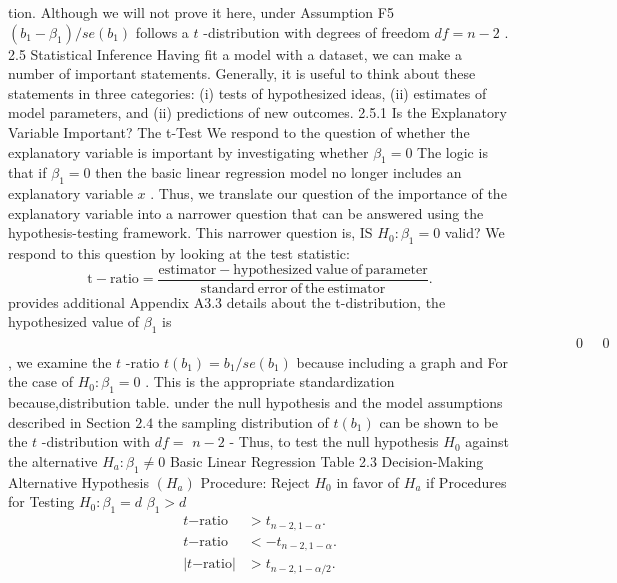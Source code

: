 \documentclass[11pt]{article}
\begin{document}
tion. Although we will not prove it here, under Assumption F5 \(\left( b_{1}-\beta_{1} \right) / s e ( b_{1} )\)
follows a \(t\) -distribution with degrees of freedom \(d f=n-2\) .
 2.5 Statistical Inference
Having fit a model with a dataset, we can make a number of important statements.
Generally, it is useful to think about these statements in three categories: (i) tests
of hypothesized ideas, (ii) estimates of model parameters, and (ii) predictions of
new outcomes.
2.5.1 Is the Explanatory Variable Important? The t-Test
We respond to the question of whether the explanatory variable is important
by investigating whether \(\beta_{1}=0\) The logic is that if \(\beta_{1}=0\) then the basic
linear regression model no longer includes an explanatory variable \(x\) . Thus,
 we translate our question of the importance of the explanatory variable into a
 narrower question that can be answered using the hypothesis-testing framework.
This narrower question is, IS \(H_{0} : \beta_{1}=0\) valid? We respond to this question by
looking at the test statistic:
\[
\mathrm{t-r a t i o}=\frac{\mathrm{e s t i m a t o r-h y p o t h e s i z e d ~ v a l u e ~ o f ~ p a r a m e t e r}} {\mathrm{s t a n d a r d ~ e r r o r ~ o f ~ t h e ~ e s t i m a t o r}} .
\]
provides additional
Appendix A3.3
details about the
t-distribution,
 the hypothesized value of \(\beta_{1}\) is \(\; \; \; \; \; \; \; \; \; \; \; \; \; \; \; \; \; \; \; \; \; \; \; \; \; \; \; \; \; \; \; \; \; \; \; \; \; \; \; \; \; \; \; \; \; \; \; \; \; \; \; \; \; \; \; \; \; \; \; \; \; \; \; \; \; \; \; \; \; \; \; \; \; \; \; \; \; \; \; \; \; \; \; \; \; \; \; \; \; \; \; \; \; \; \; \; \; \; \; \; \; \; \; \; \; \; \; \; \; \; \; \; \; \; \; \; \; \; \; \; \; \; \; \; \; \; \; \; \; \; \; \; \; \; \; \; \; \; \; \; \; \; \; \; \; \; 0 \; \; \; \; \; 0\) , we examine the \(t\) -ratio \(t ( b_{1} )=b_{1} / s e ( b_{1} )\) because including a graph and
For the case of \(H_{0} : \beta_{1}=0\) . This is the appropriate standardization because,distribution table.
under the null hypothesis and the model assumptions described in Section \(2 . 4\)
the sampling distribution of \(t ( b_{1} )\) can be shown to be the \(t\) -distribution with \(d f=\)
\(n-2\) - Thus, to test the null hypothesis \(H_{0}\) against the alternative \(H_{a} : \beta_{1} \neq0\)
 Basic Linear Regression
Table 2.3
Decision-Making Alternative Hypothesis \(( H_{a} )\) Procedure: Reject \(H_{0}\) in favor of \(H_{a}\) if
Procedures for
Testing \(H_{0} : \beta_{1}=d\) \(\beta_{1} > d\)
\[
\begin{aligned} {t \mathrm{-r a t i o}} & {{} > t_{n-2 , 1-\alpha} .} \\ {t \mathrm{-r a t i o}} & {{} <-t_{n-2 , 1-\alpha} .} \\ {| t \mathrm{-r a t i o} |} & {{} > t_{n-2 , 1-\alpha/ 2} .} \\ \end{aligned}
\]
\end{document}
